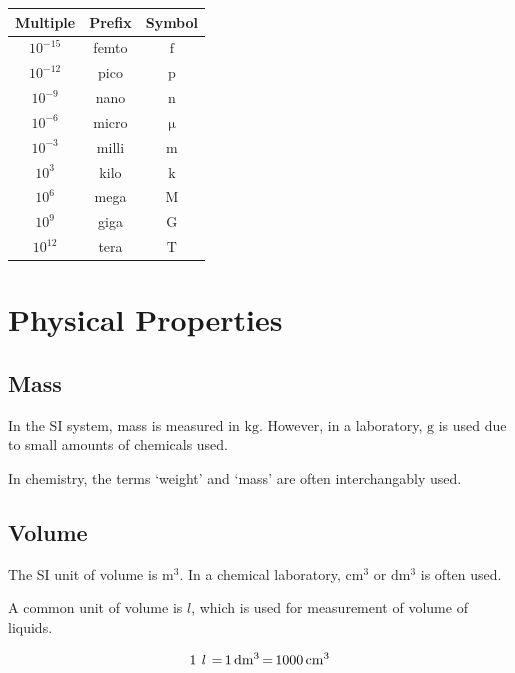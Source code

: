 \documentclass[
  14pt,
]{extarticle}
\renewenvironment{quote}{\begin{myquote}}{\end{myquote}}
\begin{document}
\begin{longtable}[]{@{}ccc@{}}
\toprule()
\textbf{Multiple} & \textbf{Prefix} & \textbf{Symbol} \\
\midrule()
\endhead
\(10^{-15}\) & femto & \({\mathrm{f}}\) \\
\(10^{-12}\) & pico & \({\mathrm{p}}\) \\
\(10^{-9}\) & nano & \({\mathrm{n}}\) \\
\(10^{-6}\) & micro & \({\mathrm{\mu}}\) \\
\(10^{-3}\) & milli & \({\mathrm{m}}\) \\
\(10^{3}\) & kilo & \({\mathrm{k}}\) \\
\(10^{6}\) & mega & \({\mathrm{M}}\) \\
\(10^{9}\) & giga & \({\mathrm{G}}\) \\
\(10^{12}\) & tera & \({\mathrm{T}}\) \\
\bottomrule()
\end{longtable}

\hypertarget{physical-properties}{%
\section{Physical Properties}\label{physical-properties}}

\hypertarget{mass}{%
\subsection{Mass}\label{mass}}

In the SI system, mass is measured in \({\mathrm{kg}}\). However, in a
laboratory, \({\mathrm{g}}\) is used due to small amounts of chemicals
used.

\begin{quote}
In chemistry, the terms `weight' and `mass' are often interchangably
used.
\end{quote}

\hypertarget{volume}{%
\subsection{Volume}\label{volume}}

The SI unit of volume is \(\mathbf{{\mathrm{m^{3}}}}\). In a chemical
laboratory, \(\mathbf{{\mathrm{cm^{3}}}}\) or
\(\mathbf{{\mathrm{dm^{3}}}}\) is often used.

A common unit of volume is \(l\), which is used for measurement of
volume of liquids.

\[{1~\mathrm{\textit{l}~}\mkern3mu \mathrm{=}\mkern3mu \mathrm{1}\mkern3mu \mathrm{dm^{3}}\mkern3mu \mathrm{=}\mkern3mu \mathrm{1000}\mkern3mu \mathrm{cm^{3}}}\]
\end{document}
